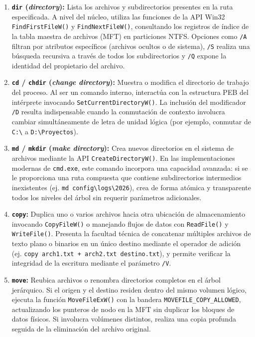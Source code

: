 \documentclass[12pt]{article}
\begin{document}
\begin{enumerate}[noitemsep, topsep=2pt]
    \item \textbf{\texttt{dir} (\textit{directory}):} Lista los archivos y subdirectorios presentes en la ruta especificada. A nivel del núcleo, utiliza las funciones de la API Win32 \texttt{FindFirstFileW()} y \texttt{FindNextFileW()}, consultando los registros de índice de la tabla maestra de archivos (MFT) en particiones NTFS. Opciones como \texttt{/A} filtran por atributos específicos (archivos ocultos o de sistema), \texttt{/S} realiza una búsqueda recursiva a través de todos los subdirectorios y \texttt{/Q} expone la identidad del propietario del archivo.
    \item \textbf{\texttt{cd} / \texttt{chdir} (\textit{change directory}):} Muestra o modifica el directorio de trabajo del proceso. Al ser un comando interno, interactúa con la estructura PEB del intérprete invocando \texttt{SetCurrentDirectoryW()}. La inclusión del modificador \texttt{/D} resulta indispensable cuando la conmutación de contexto involucra cambiar simultáneamente de letra de unidad lógica (por ejemplo, conmutar de \texttt{C:\textbackslash} a \texttt{D:\textbackslash Proyectos}).
    \item \textbf{\texttt{md} / \texttt{mkdir} (\textit{make directory}):} Crea nuevos directorios en el sistema de archivos mediante la API \texttt{CreateDirectoryW()}. En las implementaciones modernas de \texttt{cmd.exe}, este comando incorpora una capacidad avanzada: si se le proporciona una ruta compuesta que contiene subdirectorios intermedios inexistentes (ej. \texttt{md config\textbackslash logs\textbackslash 2026}), crea de forma atómica y transparente todos los niveles del árbol sin requerir parámetros adicionales.
    \item \textbf{\texttt{copy}:} Duplica uno o varios archivos hacia otra ubicación de almacenamiento invocando \texttt{CopyFileW()} o manejando flujos de datos con \texttt{ReadFile()} y \texttt{WriteFile()}. Presenta la facultad técnica de concatenar múltiples archivos de texto plano o binarios en un único destino mediante el operador de adición (ej. \texttt{copy arch1.txt + arch2.txt destino.txt}), y permite verificar la integridad de la escritura mediante el parámetro \texttt{/V}.
    \item \textbf{\texttt{move}:} Reubica archivos o renombra directorios completos en el árbol jerárquico. Si el origen y el destino residen dentro del mismo volumen lógico, ejecuta la función \texttt{MoveFileExW()} con la bandera \texttt{MOVEFILE\_COPY\_ALLOWED}, actualizando los punteros de nodo en la MFT sin duplicar los bloques de datos físicos. Si involucra volúmenes distintos, realiza una copia profunda seguida de la eliminación del archivo original.

\end{enumerate}
\end{document}
